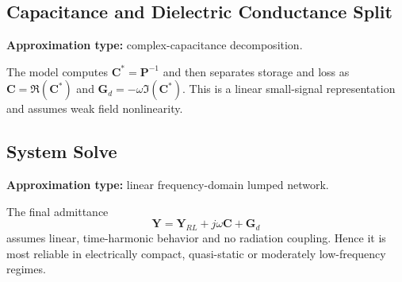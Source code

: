 \documentclass[11pt]{article}
\begin{document}
\subsection{Capacitance and Dielectric Conductance Split}
\textbf{Approximation type:} complex-capacitance decomposition.

The model computes $\bm{C}^*=\bm{P}^{-1}$ and then separates storage and loss as
$\bm{C}=\Re(\bm{C}^*)$ and $\bm{G}_d=-\omega\Im(\bm{C}^*)$.
This is a linear small-signal representation and assumes weak field nonlinearity.

\subsection{System Solve}
\textbf{Approximation type:} linear frequency-domain lumped network.

The final admittance
\[
\bm{Y}=\bm{Y}_{RL}+j\omega\bm{C}+\bm{G}_d
\]
assumes linear, time-harmonic behavior and no radiation coupling.
Hence it is most reliable in electrically compact, quasi-static or moderately low-frequency regimes.
\end{document}
